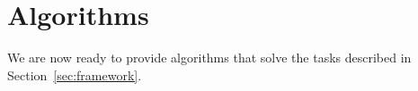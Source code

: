 \section{Algorithms}\label{sec:alg}
We are now ready to provide  algorithms that solve the tasks described in Section~\ref{sec:framework}.

\begin{comment}
    \subsection{Identifying the Candidates' Set}
\label{candidatesset}

\begin{definition}
    \textbf{Candidates Set}: The set of candidates which have a chance to be the query answer.
\end{definition}
 To identify the candidates set, we must ensure it includes any potential query answer while excluding any candidates that can be definitively ruled out as the query answer.
 Ultimately, our goal is to choose a candidate among all which has the highest score in the candidates set with respect to the scoring function. In other words:

\[
\text{Query answer = } \arg\max_{c \in \text{C}} \mathcal{F}(c, q)
\]
Where \(\text{C}\) is the candidates set.

\begin{example}
    Given $n$ entities and a fixed $k$, there are \( \binom{n}{k} \) unique combinations of k entities. Depending on the scoring function and the context of the problem, a subset or the whole set of such candidates form the candidates set. Considering the running example to find out the top-3 hotels among the 5 ones mentioned in \autoref{tab:ny_hotels_relevance}, there can be \( \binom{5}{3} = 10 \) sets of size 3 among the whole 5 hotels. Hence, assuming all possible combinations have a chance to be the top-3 set, we will have:
    \[
    \text{C} = 
    \begin{cases}
    c_1 = \{ \text{HNY}, \text{MLN}, \text{HYN} \}, & c_2 = \{ \text{HNY}, \text{MLN}, \text{SHN} \} \\
    c_3 = \{ \text{HNY}, \text{MLN}, \text{WLD} \}, & c_4 = \{ \text{HNY}, \text{HYN}, \text{SHN} \} \\
    c_5 = \{ \text{HNY}, \text{HYN}, \text{WLD} \}, & c_6 = \{ \text{HNY}, \text{SHN}, \text{WLD} \} \\
    c_7 = \{ \text{MLN}, \text{HYN}, \text{SHN} \}, & c_8 = \{ \text{MLN}, \text{HYN}, \text{WLD} \} \\
    c_9 = \{ \text{MLN}, \text{SHN}, \text{WLD} \}, & c_{10} = \{ \text{HYN}, \text{SHN}, \text{WLD} \} 
    \end{cases}
\]


\end{comment}
